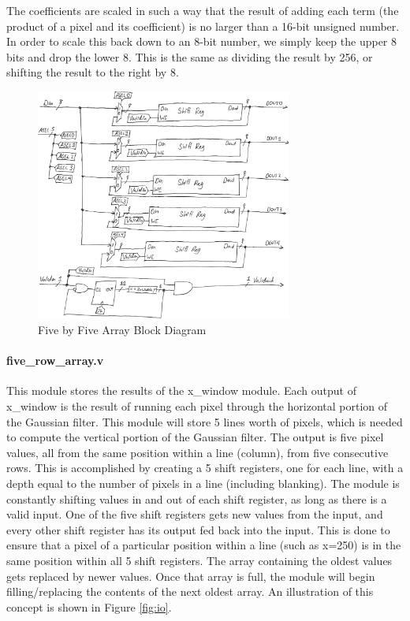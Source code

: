The coefficients are scaled in such a way that the result of adding each term 
(the product of a pixel and its coefficient) is no larger than a 16-bit unsigned 
number. In order to scale this back down to an 8-bit number, we simply keep the 
upper 8 bits and drop the lower 8. This is the same as dividing the result by 
256, or shifting the result to the right by 8.

\begin{figure}
    \centering
    \includegraphics[width=0.75\textwidth]{processed_image_pngs/array.png}
    \caption{Five by Five Array Block Diagram}
    \label{fig:array}
\end{figure}


\paragraph{five\_row\_array.v}
This module stores the results of the x\_window module. Each output of x\_window 
is the result of running each pixel through the horizontal portion of the 
Gaussian filter. This module will store 5 lines worth of pixels, which is needed 
to compute the vertical portion of the Gaussian filter. The output is five pixel 
values, all from the same position within a line (column), from five consecutive 
rows. This is accomplished by creating a 5 shift registers, one for each line, 
with a depth equal to the number of pixels in a line (including blanking).
The module is constantly shifting values in and out of each shift register, as 
long as there is a valid input. One of the five shift registers gets new values 
from the input, and every other shift register has its output fed back into the 
input. This is done to ensure that a pixel of a particular position within 
a line (such as x=250) is in the same position within all 5 shift registers. The 
array containing the oldest values gets replaced by newer values. Once that 
array is full, the module will begin filling/replacing the contents of the next 
oldest array. An illustration of this concept is shown in Figure \ref{fig:io}. 

